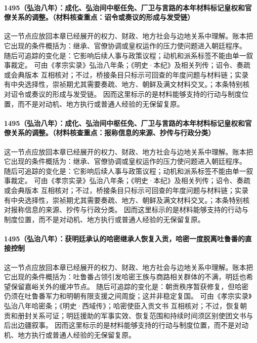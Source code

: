 \paragraph{1495（弘治八年）：成化、弘治间中枢任免、厂卫与言路的本年材料标记皇权和官僚关系的调整。（材料核查重点：诏令或奏议的形成与发受链）} 这一节点应放回本章已经展开的权力、财政、地方社会与边地关系中理解。账本把它出现的条件概括为：继承、官僚协调或皇权运作的压力使问题进入朝廷程序。 随后可追踪的变化是：它影响后续人事与政策议程；动机和派系标签不能由单一叙事裁定。 可由《孝宗实录》弘治八年条；《明史·本纪》及相关列传；诏令、奏疏或会典版本 互相核对；不过，桥接条目只标示可回查的年度问题与材料链；实录有中央选择性，崇祯期尤其需要奏疏、地方、朝鲜及满文材料交叉。；本条特别核对诏令或奏议的形成与发受链。 因而这里标示的是材料能够支持的行动与制度位置，而不是对动机、地方执行或普通人经验的无保留复原。

\paragraph{1495（弘治八年）：成化、弘治间中枢任免、厂卫与言路的本年材料标记皇权和官僚关系的调整。（材料核查重点：报称信息的来源、抄传与行政分类）} 这一节点应放回本章已经展开的权力、财政、地方社会与边地关系中理解。账本把它出现的条件概括为：继承、官僚协调或皇权运作的压力使问题进入朝廷程序。 随后可追踪的变化是：它影响后续人事与政策议程；动机和派系标签不能由单一叙事裁定。 可由《孝宗实录》弘治八年条；《明史·本纪》及相关列传；诏令、奏疏或会典版本 互相核对；不过，桥接条目只标示可回查的年度问题与材料链；实录有中央选择性，崇祯期尤其需要奏疏、地方、朝鲜及满文材料交叉。；本条特别核对报称信息的来源、抄传与行政分类。 因而这里标示的是材料能够支持的行动与制度位置，而不是对动机、地方执行或普通人经验的无保留复原。

\paragraph{1495（弘治八年）：获明廷承认的哈密继承人恢复入贡，哈密一度脱离吐鲁番的直接控制} 这一节点应放回本章已经展开的权力、财政、地方社会与边地关系中理解。账本把它出现的条件概括为：吐鲁番占领引发哈密王族与商路相关群体的不满，明廷也希望保留嘉峪关外的缓冲节点。 随后可追踪的变化是：朝贡秩序暂获修复，但哈密仍须在吐鲁番军力和明朝有限支援之间周旋；这并非稳定复国。 可由《孝宗实录》弘治八年哈密条；《明史·西域传》；哈密使臣入贡文书 互相核对；不过，恢复朝贡和册封关系可证；明廷援助的军事实效、恢复范围和持续时间须区别使团文书与后出边疆叙事。 因而这里标示的是材料能够支持的行动与制度位置，而不是对动机、地方执行或普通人经验的无保留复原。

